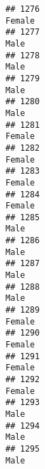 \documentclass[]{article}
\begin{document}
\begin{verbatim}
## 1276                                                                                                                          Female
## 1277                                                                                                                            Male
## 1278                                                                                                                            Male
## 1279                                                                                                                            Male
## 1280                                                                                                                            Male
## 1281                                                                                                                          Female
## 1282                                                                                                                          Female
## 1283                                                                                                                          Female
## 1284                                                                                                                          Female
## 1285                                                                                                                            Male
## 1286                                                                                                                            Male
## 1287                                                                                                                            Male
## 1288                                                                                                                            Male
## 1289                                                                                                                          Female
## 1290                                                                                                                          Female
## 1291                                                                                                                          Female
## 1292                                                                                                                          Female
## 1293                                                                                                                            Male
## 1294                                                                                                                            Male
## 1295                                                                                                                            Male

\end{verbatim}
\end{document}
